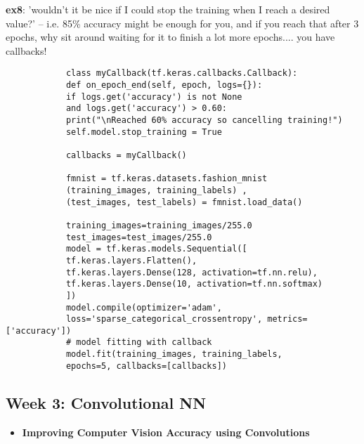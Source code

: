 \documentclass[20pt]{article}
\begin{document}
\begin{itemize}
		\textbf{ex8}: 'wouldn't it be nice if I could stop the training when I reach a desired value?' -- i.e. 85\% accuracy might be enough for you, and if you reach that after 3 epochs, why sit around waiting for it to finish a lot more epochs.... you have callbacks!
		\begin{verbatim}
			class myCallback(tf.keras.callbacks.Callback):
			def on_epoch_end(self, epoch, logs={}):
			if logs.get('accuracy') is not None
			and logs.get('accuracy') > 0.60:
			print("\nReached 60% accuracy so cancelling training!")
			self.model.stop_training = True
			
			callbacks = myCallback()
			
			fmnist = tf.keras.datasets.fashion_mnist
			(training_images, training_labels) , 
			(test_images, test_labels) = fmnist.load_data()
			
			training_images=training_images/255.0
			test_images=test_images/255.0
			model = tf.keras.models.Sequential([
			tf.keras.layers.Flatten(),
			tf.keras.layers.Dense(128, activation=tf.nn.relu),
			tf.keras.layers.Dense(10, activation=tf.nn.softmax)
			])
			model.compile(optimizer='adam',
			loss='sparse_categorical_crossentropy', metrics=['accuracy'])
			# model fitting with callback
			model.fit(training_images, training_labels,
			epochs=5, callbacks=[callbacks])
		\end{verbatim}
	\end{itemize}
	\subsection{Week 3: Convolutional NN}
	\begin{itemize}
		\item \textbf{Improving Computer Vision Accuracy using Convolutions}\\
		
		
		
	\end{itemize}
	
	
\end{document}
